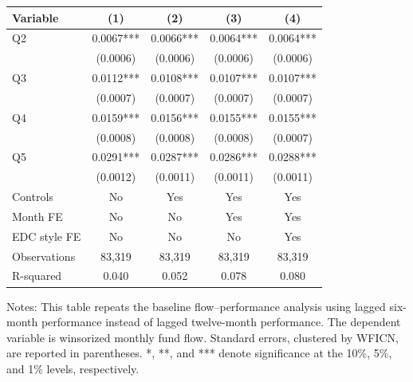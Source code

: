 \documentclass{article}
\begin{document}
\begin{table}[htbp]
\begin{threeparttable}
\begin{tabular}{lcccc}
\toprule
Variable & (1) & (2) & (3) & (4) \\
\midrule
Q2 & 0.0067*** & 0.0066*** & 0.0064*** & 0.0064*** \\
 & (0.0006) & (0.0006) & (0.0006) & (0.0006) \\
Q3 & 0.0112*** & 0.0108*** & 0.0107*** & 0.0107*** \\
 & (0.0007) & (0.0007) & (0.0007) & (0.0007) \\
Q4 & 0.0159*** & 0.0156*** & 0.0155*** & 0.0155*** \\
 & (0.0008) & (0.0008) & (0.0008) & (0.0007) \\
Q5 & 0.0291*** & 0.0287*** & 0.0286*** & 0.0288*** \\
 & (0.0012) & (0.0011) & (0.0011) & (0.0011) \\
\midrule
Controls & No & Yes & Yes & Yes \\
Month FE & No & No & Yes & Yes \\
EDC style FE & No & No & No & Yes \\
Observations & 83,319 & 83,319 & 83,319 & 83,319 \\
R-squared & 0.040 & 0.052 & 0.078 & 0.080 \\
\bottomrule
\end{tabular}

\begin{tablenotes}
\footnotesize
\item Notes: This table repeats the baseline flow--performance analysis using lagged six-month performance instead of lagged twelve-month performance. The dependent variable is winsorized monthly fund flow. Standard errors, clustered by WFICN, are reported in parentheses. *, **, and *** denote significance at the 10\%, 5\%, and 1\% levels, respectively.
\end{tablenotes}

\end{threeparttable}
\end{table}
\end{document}

